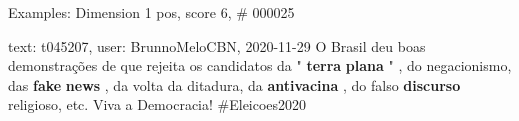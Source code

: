 \begin{frame}{Examples: Dimension 1 pos, score 6, \# 000025}
\footnotesize
\begin{exampleblock}{text: t045207, user: BrunnoMeloCBN, 2020-11-29}
O Brasil deu boas demonstrações de que rejeita os candidatos da " 
\textbf{terra} \textbf{plana} " , do negacionismo, das \textbf{fake} 
\textbf{news} , da volta da ditadura, da \textbf{antivacina} , do falso 
\textbf{discurso} religioso, etc. Viva a Democracia!  
\#Eleicoes2020 
\end{exampleblock}
\end{frame}
